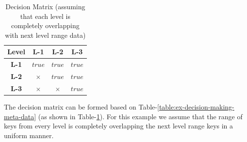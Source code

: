 \begin{table}
    \resizebox{\linewidth}{!}{%
    \begin{tabular}{|c|c|c|c|c|} %
        \hline
        \textbf{Level} & \textbf{\# of $E_{useful}$} & \textbf{\# of $E_{unuseful}$} & \textbf{min key} & \textbf{max key} \\ %
        \hline
        L-0 & \-- & \-- & \-- & \-- \\ %
        \hline
        L-1 & 2K & 2K & $x_{1}$ & $y_{1}$ \\ %
        \hline
        L-2 & 5K & 3K & $x_{2}$ & $y_{2}$ \\ %
        \hline
        L-3 & 6.5K & 1.5K & $x_{3}$ & $y_{3}$ \\ %
        \hline
    \end{tabular}}
    \caption{Decision Making Data }
    \label{table:ex-decision-making-meta-data}
\end{table}

\begin{table}
    \captionsetup{justification=centering,margin=2cm}
    \begin{tabular}{ |c|c|c|c| }
        \hline
        \textbf{Level} & \textbf{L-1} & \textbf{L-2} & \textbf{L-3} \\
        \hline
        \textbf{L-1} & $true$ & $true$ & $true$ \\
        \hline
        \textbf{L-2} & $\times$ & $true$ & $true$ \\
        \hline
        \textbf{L-3} &  $\times$ &  $\times$ & $true$ \\
        \hline
    \end{tabular}
    \caption{Decision Matrix (assuming that each level is completely overlapping with next level range data)}
    \label{table:ex-decision-matrix}
\end{table}

The decision matrix can be formed based on Table-\ref{table:ex-decision-making-meta-data} (as shown in 
Table-\ref{table:ex-decision-matrix}). For this example we assume that the range of keys from every level is completely
overlapping the next level range keys in a uniform manner.
















